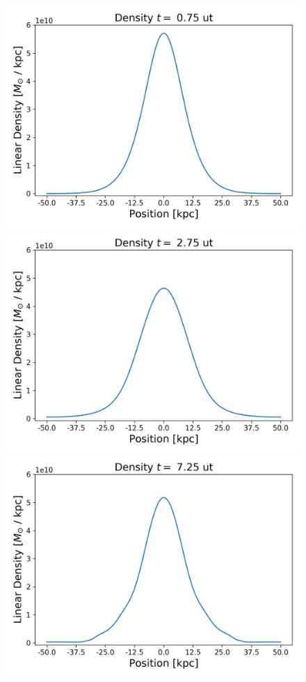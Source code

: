 \begin{figure}[h!]
    \centering
    \includegraphics[scale=0.45]{imag/gaussD3.png}
    \includegraphics[scale=0.45]{imag/gaussD11.png}
    \includegraphics[scale=0.45]{imag/gaussD29.png}

\end{figure}
